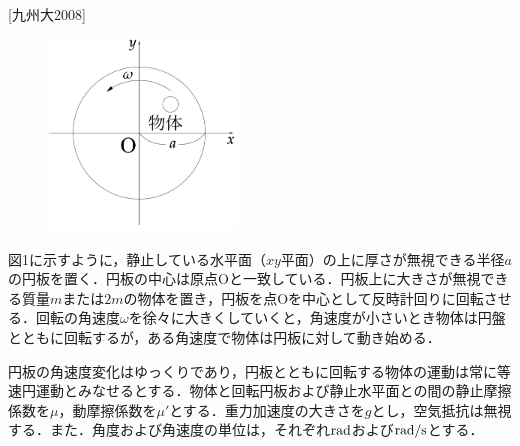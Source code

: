 

\noindent
{} [九州大2008]

\begin{figure}
  \centering
  \includegraphics[width=5cm]{fig/fig_1_13_1.pdf}
  \caption{}
\end{figure}
図1に示すように，静止している水平面（$xy$平面）の上に厚さが無視できる半径$a$の円板を置く．円板の中心は原点Oと一致している．円板上に大きさが無視できる質量$m$または$2m$の物体を置き，円板を点Oを中心として反時計回りに回転させる．回転の角速度$\omega$を徐々に大きくしていくと，角速度が小さいとき物体は円盤とともに回転するが，ある角速度で物体は円板に対して動き始める．


円板の角速度変化はゆっくりであり，円板とともに回転する物体の運動は常に等速円運動とみなせるとする．物体と回転円板および静止水平面との間の静止摩擦係数を$\mu$，動摩擦係数を$\mu'$とする．重力加速度の大きさを$g$とし，空気抵抗は無視する．また．角度および角速度の単位は，それぞれ$\mathrm{rad}$および$\mathrm{rad/s}$とする．

